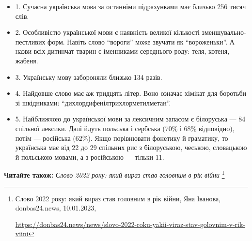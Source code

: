 \begin{itemize} %
\item 1. Сучасна українська мова за останніми підрахунками має близько 256 тисяч слів.

\item 2. Особливістю української мови є наявність великої кількості
зменшувально-пестливих форм. Навіть слово \enquote{вороги} може звучати як
\enquote{вороженьки}. А назви всіх дитинчат тварин є іменниками середнього роду:
теля, котеня, жабеня.

\item 3. Українську мову забороняли близько 134 разів.

\item 4. Найдовше слово має аж тридцять літер. Воно означає хімікат для боротьби зі шкідниками: \enquote{дихлордифенілтрихлорметилметан}.

\item 5. Найближчою до української мови за лексичним запасом є білоруська — 84%
спільної лексики. Далі йдуть польська і сербська (70\% і 68\% відповідно),
потім — російська (62\%). Якщо порівнювати фонетику й граматику, то
українська має від 22 до 29 спільних рис з білоруською, чеською, словацькою
й польською мовами, а з російською — тільки 11.

\end{itemize} %

\textbf{Читайте також:} \emph{Слово 2022 року: який вираз став головним в рік війни}%
\footnote{Слово 2022 року: який вираз став головним в рік війни, Яна Іванова, donbas24.news, 10.01.2023, \par\url{https://donbas24.news/news/slovo-2022-roku-yakii-viraz-stav-golovnim-v-rik-viini}}


